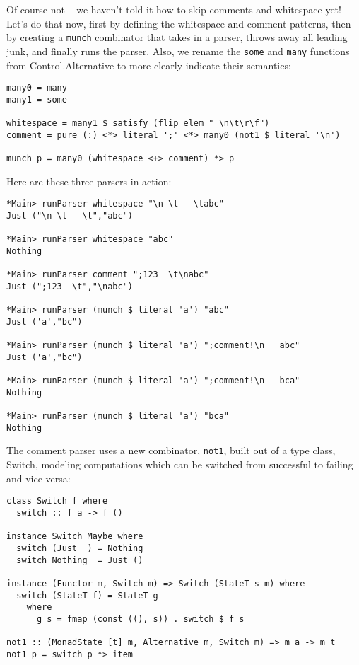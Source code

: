 \documentclass{tmr}
\begin{document}
Of course not -- we haven't told it how to skip comments and whitespace yet!
Let's do that now, first by defining the whitespace and comment patterns, then
by creating a \verb+munch+ combinator that takes in a parser, 
throws away all leading junk, and finally runs the parser.  Also, we rename
the \verb+some+ and \verb+many+ functions from Control.Alternative to more
clearly indicate their semantics: 
\begin{verbatim}
many0 = many
many1 = some

whitespace = many1 $ satisfy (flip elem " \n\t\r\f")
comment = pure (:) <*> literal ';' <*> many0 (not1 $ literal '\n')

munch p = many0 (whitespace <+> comment) *> p
\end{verbatim}

Here are these three parsers in action:
\begin{verbatim}
*Main> runParser whitespace "\n \t   \tabc"
Just ("\n \t   \t","abc")

*Main> runParser whitespace "abc"
Nothing

*Main> runParser comment ";123  \t\nabc"
Just (";123  \t","\nabc")

*Main> runParser (munch $ literal 'a') "abc"
Just ('a',"bc")

*Main> runParser (munch $ literal 'a') ";comment!\n   abc"
Just ('a',"bc")

*Main> runParser (munch $ literal 'a') ";comment!\n   bca"
Nothing

*Main> runParser (munch $ literal 'a') "bca"
Nothing
\end{verbatim}

The comment parser uses a new combinator, \verb+not1+, built out of a 
type class, Switch, modeling computations which can be switched from
successful to failing and vice versa:
\begin{verbatim}
class Switch f where
  switch :: f a -> f ()

instance Switch Maybe where
  switch (Just _) = Nothing
  switch Nothing  = Just ()

instance (Functor m, Switch m) => Switch (StateT s m) where
  switch (StateT f) = StateT g
    where 
      g s = fmap (const ((), s)) . switch $ f s

not1 :: (MonadState [t] m, Alternative m, Switch m) => m a -> m t
not1 p = switch p *> item
\end{verbatim}
\end{document}
